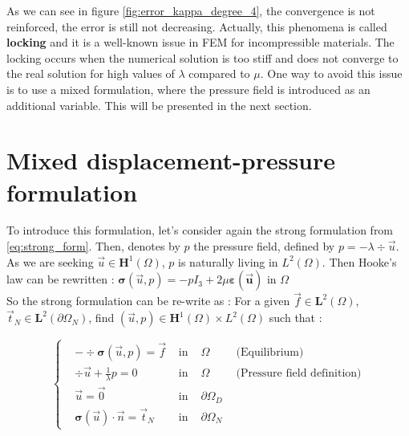 \documentclass[a4paper,12pt,twoside]{report}
\begin{document}
As we can see in figure \ref{fig:error_kappa_degree_4}, the convergence is not reinforced, the error is still not decreasing. Actually, this phenomena is called \textbf{locking} and it is a well-known issue in FEM for incompressible materials. The locking occurs when the numerical solution is too stiff and does not converge to the real solution for high values of $\lambda$ compared to $\mu$.
One way to avoid this issue is to use a mixed formulation, where the pressure field is introduced as an additional variable. This will be presented in the next section.

\section{Mixed displacement-pressure formulation}
To introduce this formulation, let's consider again the strong formulation from \eqref{eq:strong_form}. Then, denotes by $p$ the pressure field, defined by $\displaystyle p = - \lambda \div{\vec u}$. As we are seeking $\vec u \in \boldsymbol{H}^1(\Omega)$, $p$ is naturally living in $L^2(\Omega)$. Then Hooke's law can be rewritten : $\boldsymbol{\sigma} (\vec u,p) = -p I_3 + 2\mu \boldsymbol{\varepsilon(\vec u)} \text{ in }  \Omega $ \\
So the strong formulation can be re-write as : For a given $\vec f \in \boldsymbol L^2(\Omega)$, $\vec t_N \in \boldsymbol L^2(\partial \Omega_N)$, find $(\vec u, p) \in \boldsymbol H^1(\Omega)\times L^2(\Omega)$ such that : 

\begin{tcolorbox}
\begin{equation}
	\label{eq:strong_pressure_disp_form}
	\left\{
	\begin{aligned}
		& - \div \boldsymbol{\sigma} (\vec u,p) = \vec f & \text{ in } & \Omega \hspace{1cm} \text{(Equilibrium)}\\
		& \div{\vec u} + \frac{1}{\lambda} p = 0 & \text{ in } & \Omega \hspace{1cm} \text{(Pressure field definition)} \\
		& \vec u = \vec 0 & \text{ in } &\partial \Omega_D \\
		& \boldsymbol{\sigma} (\vec u) \cdot \vec n = \vec t_N & \text{ in }& \partial \Omega_N
	\end{aligned}
	\right.
\end{equation}
\end{tcolorbox}
\end{document}
